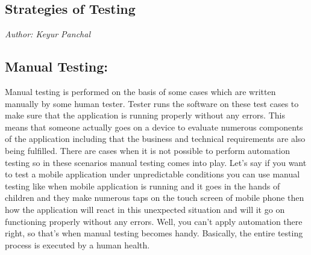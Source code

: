 


\subsection{Strategies of Testing}\label{sec:Strategies of Testing}

\textit{Author: Keyur Panchal}

\subsection{Manual Testing:}
Manual testing is performed on the basis of some cases which are written manually by some human tester. Tester runs the software on these test cases to make sure that the application is running properly without any errors. This means that someone actually goes on a device to evaluate numerous components of the application including that the business and technical requirements are also being fulfilled. There are cases when it is not possible to perform automation testing so in these scenarios manual testing comes into play. Let's say if you want to test a mobile application under unpredictable conditions you can use manual testing like when mobile application is running and it goes in the hands of children and they make numerous taps on the touch screen of mobile phone then how the application will react in this unexpected situation and will it go on functioning properly without any errors. Well, you can't apply automation there right, so that's when manual testing becomes handy. Basically, the entire testing process is executed by a human health.


